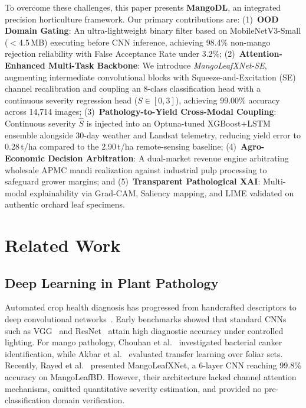\documentclass[conference]{IEEEtran}
\begin{document}
To overcome these challenges, this paper presents \textbf{MangoDL}, an integrated precision horticulture framework. Our primary contributions are:
(1)~\textbf{OOD Domain Gating}: An ultra-lightweight binary filter based on MobileNetV3-Small ($<$4.5\,MB) executing before CNN inference, achieving 98.4\% non-mango rejection reliability with False Acceptance Rate under 3.2\%;
(2)~\textbf{Attention-Enhanced Multi-Task Backbone}: We introduce \textit{MangoLeafXNet-SE}, augmenting intermediate convolutional blocks with Squeeze-and-Excitation (SE) channel recalibration and coupling an 8-class classification head with a continuous severity regression head ($S \in [0, 3]$), achieving 99.00\% accuracy across 14,714 images;
(3)~\textbf{Pathology-to-Yield Cross-Modal Coupling}: Continuous severity $\hat{S}$ is injected into an Optuna-tuned XGBoost+LSTM ensemble alongside 30-day weather and Landsat telemetry, reducing yield error to 0.28\,t/ha compared to the 2.90\,t/ha remote-sensing baseline;
(4)~\textbf{Agro-Economic Decision Arbitration}: A dual-market revenue engine arbitrating wholesale APMC mandi realization against industrial pulp processing to safeguard grower margins; and
(5)~\textbf{Transparent Pathological XAI}: Multi-modal explainability via Grad-CAM, Saliency mapping, and LIME validated on authentic orchard leaf specimens.

\section{Related Work}

\subsection{Deep Learning in Plant Pathology}
Automated crop health diagnosis has progressed from handcrafted descriptors to deep convolutional networks~\cite{kamilaris2018deep,singh2021deep}. Early benchmarks showed that standard CNNs such as VGG~\cite{simonyan2014very} and ResNet~\cite{he2016deep} attain high diagnostic accuracy under controlled lighting. For mango pathology, Chouhan et al.~\cite{chouhan2020soft} investigated bacterial canker identification, while Akbar et al.~\cite{akbar2022mango} evaluated transfer learning over foliar sets. Recently, Rayed et al.~\cite{rayed2025mangoleafxnet} presented MangoLeafXNet, a 6-layer CNN reaching 99.8\% accuracy on MangoLeafBD. However, their architecture lacked channel attention mechanisms, omitted quantitative severity estimation, and provided no pre-classification domain verification.
\end{document}
